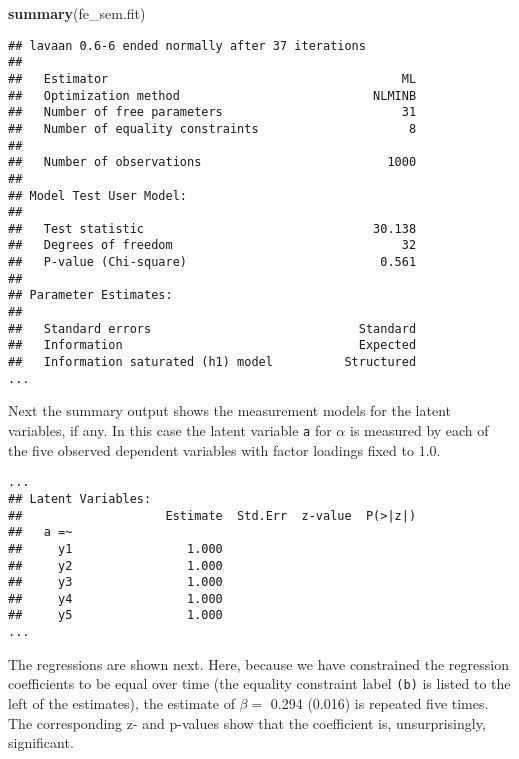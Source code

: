 \documentclass[
  12pt,
  a4paper]{article}
\newenvironment{Shaded}{\begin{snugshade}}{\end{snugshade}}
\newcommand{\KeywordTok}[1]{\textcolor[rgb]{0.13,0.29,0.53}{\textbf{#1}}}
\newcommand{\NormalTok}[1]{#1}
\begin{document}
\singlespacing

\begin{Shaded}
\begin{Highlighting}[]
\KeywordTok{summary}\NormalTok{(fe_sem.fit)}
\end{Highlighting}
\end{Shaded}

\begin{verbatim}
## lavaan 0.6-6 ended normally after 37 iterations
## 
##   Estimator                                         ML
##   Optimization method                           NLMINB
##   Number of free parameters                         31
##   Number of equality constraints                     8
##                                                       
##   Number of observations                          1000
##                                                       
## Model Test User Model:
##                                                       
##   Test statistic                                30.138
##   Degrees of freedom                                32
##   P-value (Chi-square)                           0.561
## 
## Parameter Estimates:
## 
##   Standard errors                             Standard
##   Information                                 Expected
##   Information saturated (h1) model          Structured
...
\end{verbatim}

\doublespacing

Next the summary output shows the measurement models for the latent
variables, if any. In this case the latent variable \texttt{a} for
\(\alpha\) is measured by each of the five observed dependent variables
with factor loadings fixed to 1.0.

\singlespacing

\begin{verbatim}
...
## Latent Variables:
##                    Estimate  Std.Err  z-value  P(>|z|)
##   a =~                                                
##     y1                1.000                           
##     y2                1.000                           
##     y3                1.000                           
##     y4                1.000                           
##     y5                1.000                           
...
\end{verbatim}

\doublespacing

The regressions are shown next. Here, because we have constrained the
regression coefficients to be equal over time (the equality constraint
label \texttt{(b)} is listed to the left of the estimates), the estimate
of \(\beta =\) 0.294 (0.016) is repeated five times. The corresponding
z- and p-values show that the coefficient is, unsurprisingly,
significant.
\end{document}
